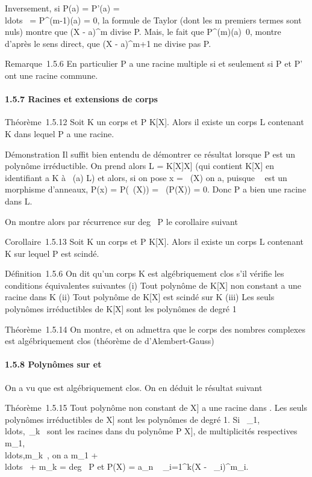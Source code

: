 \documentclass[]{article}
\begin{document}
Inversement, si P(a) = P'(a) =
\\ldots~ =
P^(m-1)(a) = 0, la formule de Taylor (dont les m premiers
termes sont nuls) montre que (X - a)^m divise P. Mais, le
fait que P^(m)(a)\neq~0, montre
d'après le sens direct, que (X - a)^m+1 ne divise pas P.

Remarque~1.5.6 En particulier P a une racine multiple si et seulement si
P et P' ont une racine commune.

\paragraph{1.5.7 Racines et extensions de corps}

Théorème~1.5.12 Soit K un corps et P \in K{[}X{]}. Alors il existe un
corps L contenant K dans lequel P a une racine.

Démonstration Il suffit bien entendu de démontrer ce résultat lorsque P
est un polynôme irréductible. On prend alors L = K{[}X{]}\diagupPK{[}X{]} (qui
contient K{[}X{]} en identifiant a \in K à \pi~(a) \in L) et alors, si on pose
x = \pi~(X) on a, puisque \pi~ est un morphisme d'anneaux, P(x) = P(\pi~(X)) =
\pi~(P(X)) = 0. Donc P a bien une racine dans L.

On montre alors par récurrence sur deg~ P le
corollaire suivant

Corollaire~1.5.13 Soit K un corps et P \in K{[}X{]}. Alors il existe un
corps L contenant K sur lequel P est scindé.

Définition~1.5.6 On dit qu'un corps K est algébriquement clos s'il
vérifie les conditions équivalentes suivantes (i) Tout polynôme de
K{[}X{]} non constant a une racine dans K (ii) Tout polynôme de K{[}X{]}
est scindé sur K (iii) Les seuls polynômes irréductibles de K{[}X{]}
sont les polynômes de degré 1

Théorème~1.5.14 On montre, et on admettra que le corps des nombres
complexes est algébriquement clos (théorème de d'Alembert-Gauss)

\paragraph{1.5.8 Polynômes sur  et ~}

On a vu que  est algébriquement clos. On en déduit le résultat suivant

Théorème~1.5.15 Tout polynôme non constant de \mathbb{C}{[}X{]} a une racine dans
. Les seuls polynômes irréductibles de \mathbb{C}{[}X{]} sont les polynômes de
degré 1. Si
\alpha~\_1,\\ldots,\alpha~\_k~
sont les racines dans  du polynôme P \in \mathbb{C}{[}X{]}, de multiplicités
respectives
m\_1,\\ldots,m\_k~,
on a m\_1 +
\\ldots~ +
m\_k = deg~ P et P(X) =
a\_n \∏ ~
\_i=1^k(X - \alpha~\_i)^m\_i.
\end{document}
